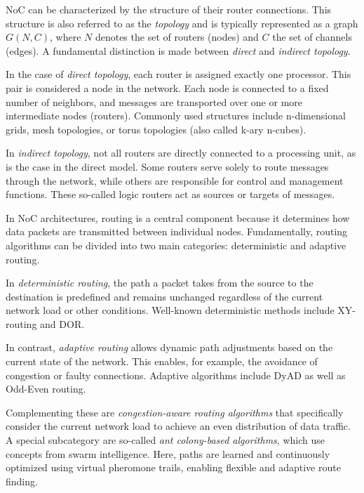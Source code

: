 \ac{NoC} can be characterized by the structure of their router connections. This structure is also referred to as the \textit{topology} and is typically represented as a graph $G(N, C)$, where $N$ denotes the set of routers (nodes) and $C$ the set of channels (edges). A fundamental distinction is made between \textit{direct} and \textit{indirect topology}.


In the case of \textit{direct topology}, each router is assigned exactly one processor. This pair is considered a node in the network. Each node is connected to a fixed number of neighbors, and messages are transported over one or more intermediate nodes (routers). Commonly used structures include n-dimensional grids, mesh topologies, or torus topologies (also called k-ary n-cubes).


In \textit{indirect topology}, not all routers are directly connected to a processing unit, as is the case in the direct model. Some routers serve solely to route messages through the network, while others are responsible for control and management functions. These so-called logic routers act as sources or targets of messages.\cite{unnikrishnan_network_2021}


In \ac{NoC} architectures, routing is a central component because it determines how data packets are transmitted between individual nodes. Fundamentally, routing algorithms can be divided into two main categories: deterministic and adaptive routing. 


In \textit{deterministic routing}, the path a packet takes from the source to the destination is predefined and remains unchanged regardless of the current network load or other conditions. Well-known deterministic methods include XY-routing and \ac{DOR}.\cite{ma_summary_2024} 

In contrast, \textit{adaptive routing} allows dynamic path adjustments based on the current state of the network. This enables, for example, the avoidance of congestion or faulty connections. Adaptive algorithms include \ac{DyAD}\cite{hu_dyad_2004} as well as Odd-Even routing.

Complementing these are \textit{congestion-aware routing algorithms} that specifically consider the current network load to achieve an even distribution of data traffic.\cite{fang_parrouting_2020} A special subcategory are so-called \textit{ant colony-based algorithms}, which use concepts from swarm intelligence. Here, paths are learned and continuously optimized using virtual pheromone trails, enabling flexible and adaptive route finding.\cite{luneque_routing_2013}


